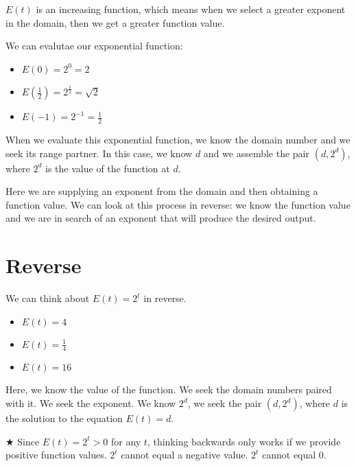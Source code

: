 \documentclass{ximera}
\begin{document}
$E(t)$ is an increasing function, which means when we select a greater exponent in the domain, then we get a greater function value.  



We can evalutae our exponential function:
\begin{itemize}
\item $E(0) = 2^0 = 2$
\item $E\left(\frac{1}{2}\right) = 2^{\tfrac{1}{2}} = \sqrt{2}$
\item $E(-1) = 2^{-1} = \frac{1}{2}$
\end{itemize}


When we evaluate this exponential function, we know the domain number and we seek its range partner. In this case, we know $d$ and we assemble the pair $(d, 2^d)$, where $2^d$ is the value of the function at $d$.



Here we are supplying an exponent from the domain and then obtaining a function value.  We can look at this process in reverse: we know the function value and we are in search of an exponent that will produce the desired output.









\section{Reverse}

We can think about $E(t) = 2^t$ in reverse.
\begin{itemize}
\item $E(t) = 4$
\item $E(t) = {\tfrac{1}{4}} $
\item $E(t) = 16 $
\end{itemize}


Here, we know the value of the function.  We seek the domain numbers paired with it. We seek the exponent. We know $2^d$, we seek the pair $(d, 2^d)$, where $d$ is the solution to the equation $E(t) = d$.




\textbf{\textcolor{red!90!darkgray}{$\bigstar$}}  Since $E(t) = 2^t > 0$ for any $t$, thinking backwards only works if we provide positive function values. $2^t$ cannot equal a negative value. $2^t$ cannot equal $0$.   \\ 
\end{document}
